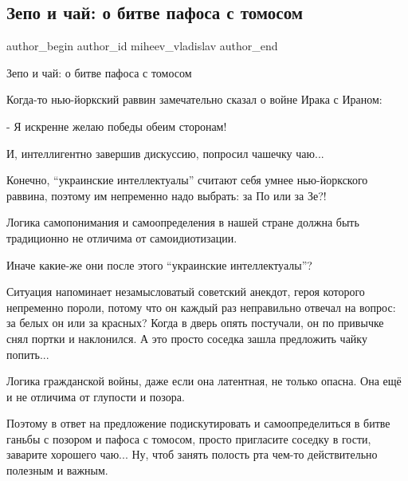  
 
 
 
 
 
\subsection{Зепо и чай: о битве пафоса с томосом}
\label{sec:18_01_2022.fb.miheev_vladislav.1.pafos_tomos_bitva}
 
\ifcmt
 author_begin
   author_id miheev_vladislav
 author_end
\fi

Зепо и чай: о битве пафоса с томосом

Когда-то нью-йоркский раввин замечательно сказал о войне Ирака с Ираном:

- Я искренне желаю победы обеим сторонам!

И, интеллигентно завершив дискуссию, попросил чашечку чаю...

Конечно, \enquote{украинские интеллектуалы} считают себя  умнее нью-йоркского
раввина, поэтому им непременно надо выбрать: за По или за Зе?! 

Логика самопонимания и самоопределения в нашей стране должна  быть традиционно
не отличима от самоидиотизации.

Иначе какие-же они после этого \enquote{украинские интеллектуалы}?

Ситуация напоминает незамысловатый советский анекдот, героя которого непременно
пороли, потому что он каждый раз неправильно отвечал на вопрос: за белых он или
за красных?  Когда в дверь опять постучали, он по привычке снял портки и
наклонился. А это просто соседка зашла предложить чайку попить... 

Логика гражданской войны, даже если она латентная, не только опасна. Она ещё и
не отличима от глупости и позора.

Поэтому в ответ на предложение подискутировать и самоопределиться в битве
ганьбы с позором и пафоса с томосом, просто пригласите соседку в гости,
заварите хорошего чаю... Ну, чтоб занять полость рта чем-то действительно
полезным и важным. 

